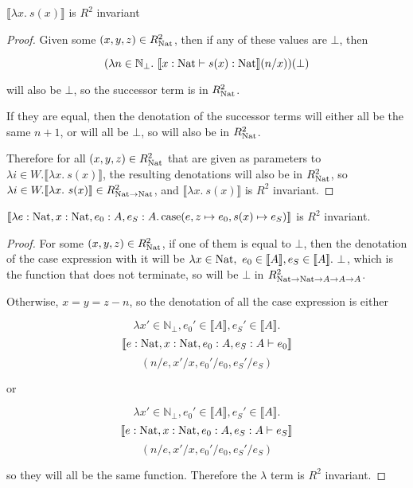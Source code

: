 \begin{lem}
$\llbracket \lambda x . \ s(x) \rrbracket$ is $R^2$ invariant
\end{lem}

\vspace{0.25cm}

\begin{proof}
Given some $(x,y,z) \in R_{\operatorname{Nat}}^2$, then if any of these values are $\bot$, then 

\[(\lambda n \in \mathbb{N}_{\bot}. \ \llbracket x : \nat \vdash s(x) : \nat \rrbracket (n/x))(\bot)\]

will also be $\bot$, so the successor term is in $R_{\operatorname{Nat}}^2$.

If they are equal, then the denotation of the successor terms will either all be the same $n + 1$, or will all be $\bot$, so will also be in $R_{\operatorname{Nat}}^2$.

Therefore for all $(x,y,z) \in R_{\operatorname{Nat}}^2$ that are given as parameters to $\lambda i \in W. \llbracket \lambda x . \ s(x) \rrbracket$, the resulting denotations will also be in $R_{\operatorname{Nat}}^2$, so $\lambda i \in W. \llbracket \lambda x . \ s(x) \rrbracket \in R_{\operatorname{Nat} \to \operatorname{Nat}}^2$, and $\llbracket \lambda x . \ s(x) \rrbracket$ is $R^2$ invariant.
\end{proof}


\vspace{0.5cm}

\begin{lem}
$\llbracket \lambda e : \operatorname{Nat}, x : \operatorname{Nat}, e_0 : A, e_S : A. \operatorname{case} (e, z \mapsto e_0, s(x) \mapsto e_S) \rrbracket$ is $R^2$ invariant.
\end{lem}

\begin{proof} For some $(x,y,z) \in R_{\operatorname{Nat}}^2$, if one of them is equal to $\bot$, then the denotation of the case expression with it will be $\lambda x \in \operatorname{Nat}, \ e_0 \in \llbracket A \rrbracket, e_S \in \llbracket A \rrbracket . \ \bot$, which is the function that does not terminate, so will be $\bot$ in $R_{\operatorname{Nat} \to \operatorname{Nat} \to A \to A \to A}^2$.

Otherwise, $x = y = z - n$, so the denotation of all the case expression is either 

\[ \lambda x' \in \mathbb{N}_{\bot}, e_0' \in \llbracket A \rrbracket ,  e_S' \in \llbracket A \rrbracket .\] \[\llbracket e : \operatorname{Nat}, x : \operatorname{Nat}, e_0 : A , e_S : A \vdash e_0 \rrbracket\]
\[ (n/e, x'/x, e_0'/e_0, e_S'/e_S)\]

or 

\[ \lambda x' \in \mathbb{N}_{\bot}, e_0' \in \llbracket A \rrbracket ,  e_S' \in \llbracket A \rrbracket .\] \[\llbracket e : \operatorname{Nat}, x : \operatorname{Nat}, e_0 : A , e_S : A \vdash e_S \rrbracket\]
\[ (n/e, x'/x, e_0'/e_0, e_S'/e_S)\]

so they will all be the same function. Therefore the $\lambda$ term is $R^2$ invariant.

\end{proof}

